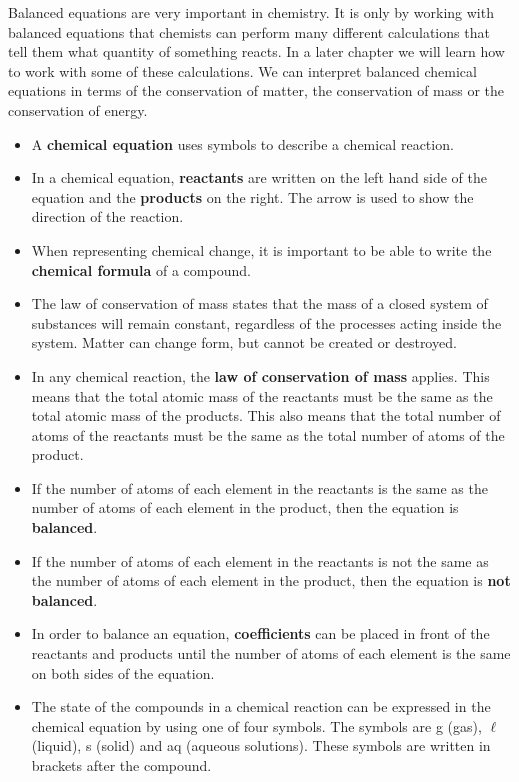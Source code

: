     \label{m38727*eip-429}Balanced equations are very important in chemistry. It is only by working with balanced equations that chemists can perform many different calculations that tell them what quantity of something reacts. In a later chapter we will learn how to work with some of these calculations. We can interpret balanced chemical equations in terms of the conservation of matter, the conservation of mass or the conservation of energy. 
            \nopagebreak
      \label{m38727*id67171}\begin{itemize}[noitemsep]
            \label{m38727*uid36}\item A \textbf{chemical equation} uses symbols to describe a chemical reaction.
\label{m38727*uid37}\item In a chemical equation, \textbf{reactants} are written on the left hand side of the equation and the \textbf{products} on the right. The arrow is used to show the direction of the reaction.
\label{m38727*uid38}\item When representing chemical change, it is important to be able to write the \textbf{chemical formula} of a compound.
\item The law of conservation of mass states that the mass of a closed system of substances will remain constant, regardless of the processes acting inside the system. Matter can change form, but cannot be created or destroyed.
\label{m38727*uid39}\item In any chemical reaction, the \textbf{law of conservation of mass} applies. This means that the total atomic mass of the reactants must be the same as the total atomic mass of the products. This also means that the total number of atoms of the reactants must be the same as the total number of atoms of the product.
\label{m38727*uid40}\item If the number of atoms of each element in the reactants is the same as the number of atoms of each element in the product, then the equation is \textbf{balanced}.
\label{m38727*uid41}\item If the number of atoms of each element in the reactants is not the same as the number of atoms of each element in the product, then the equation is \textbf{not balanced}.
\label{m38727*uid42}\item In order to balance an equation, \textbf{coefficients} can be placed in front of the reactants and products until the number of atoms of each element is the same on both sides of the equation.
\item The state of the compounds in a chemical reaction can be expressed in the chemical equation by using one of four symbols. The symbols are g (gas), $\ell$ (liquid), s (solid) and aq (aqueous solutions). These symbols are written in brackets after the compound.
\end{itemize}
